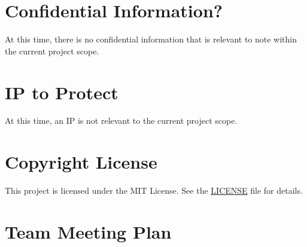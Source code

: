 \documentclass{article}
\begin{document}
\section{Confidential Information?}

\iffalse
\wss{State whether your project has confidential information from industry, or
not.  If there is confidential information, point to the agreement you have in
place.}\\
\fi

At this time, there is no confidential information that is relevant to note within the current project scope.

\iffalse
\wss{For most teams this section will just state that there is no confidential
information to protect.}
\fi
\section{IP to Protect}

\iffalse
\wss{State whether there is IP to protect.  If there is, point to the agreement.
All students who are working on a project that requires an IP agreement are also
required to sign the ``Intellectual Property Guide Acknowledgement.''}
\fi

At this time, an IP is not relevant to the current project scope.

\section{Copyright License}

\iffalse
\wss{What copyright license is your team adopting.  Point to the license in your
repo.}
\fi

This project is licensed under the MIT License. See the \href{./LICENSE}{LICENSE} file for details.

\section{Team Meeting Plan}

\iffalse
{}



\end{document}
